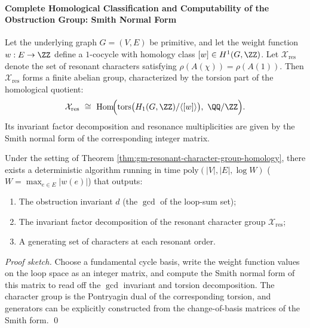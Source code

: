 \paragraph{Complete Homological Classification and Computability of the Obstruction Group: Smith Normal Form}
\begin{theorem}\label{thm:gm-resonant-character-group-homology}
Let the underlying graph \(G=(V,E)\) be primitive, and let the weight function \(w:E\to\ZZ\) define a \(1\)-cocycle with homology class \([w]\in H^1(G,\ZZ)\).
Let \(\mathcal{X}_{\mathrm{res}}\) denote the set of resonant characters satisfying \(\rho(A(\chi))=\rho(A(1))\). Then \(\mathcal{X}_{\mathrm{res}}\) forms a finite abelian group, characterized by the torsion part of the homological quotient:
\[
\mathcal{X}_{\mathrm{res}}\ \cong\ \mathrm{Hom}\!\Bigl(\mathrm{tors}\bigl(H_1(G,\ZZ)/\langle[w]\rangle\bigr),\ \QQ/\ZZ\Bigr).
\]
Its invariant factor decomposition and resonance multiplicities are given by the Smith normal form of the corresponding integer matrix.
\end{theorem}

\begin{proposition}\label{prop:gm-smith-compute-obstructions}
Under the setting of Theorem \ref{thm:gm-resonant-character-group-homology}, there exists a deterministic algorithm running in time \(\mathrm{poly}(|V|,|E|,\log W)\) (\(W=\max_{e\in E}|w(e)|\)) that outputs:
\begin{enumerate}
  \item The obstruction invariant \(d\) (the \(\gcd\) of the loop-sum set);
  \item The invariant factor decomposition of the resonant character group \(\mathcal{X}_{\mathrm{res}}\);
  \item A generating set of characters at each resonant order.
\end{enumerate}
\end{proposition}

\begin{proof}[Proof sketch]
Choose a fundamental cycle basis, write the weight function values on the loop space as an integer matrix, and compute the Smith normal form of this matrix to read off the \(\gcd\) invariant and torsion decomposition.
The character group is the Pontryagin dual of the corresponding torsion, and generators can be explicitly constructed from the change-of-basis matrices of the Smith form. \qed
\end{proof}

